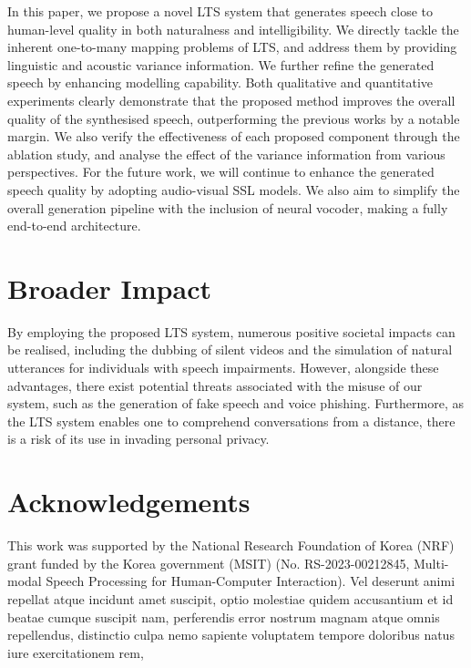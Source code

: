 \documentclass[letterpaper]{article} %
\begin{document}
In this paper, we propose a novel LTS system that generates speech close to human-level quality in both naturalness and intelligibility.
We directly tackle the inherent one-to-many mapping problems of LTS, and address them by providing linguistic and acoustic variance information.
We further refine the generated speech by enhancing modelling capability.
Both qualitative and quantitative experiments clearly demonstrate that the proposed method improves the overall quality of the synthesised speech, outperforming the previous works by a notable margin.
We also verify the effectiveness of each proposed component through the ablation study, and analyse the effect of the variance information from various perspectives.
For the future work, we will continue to enhance the generated speech quality by adopting audio-visual SSL models.
We also aim to simplify the overall generation pipeline with the inclusion of neural vocoder, making a fully end-to-end architecture.



\section{Broader Impact}
By employing the proposed LTS system, numerous positive societal impacts can be realised, including the dubbing of silent videos and the simulation of natural utterances for individuals with speech impairments.
However, alongside these advantages, there exist potential threats associated with the misuse of our system, such as the generation of fake speech and voice phishing.
Furthermore, as the LTS system enables one to comprehend conversations from a distance, there is a risk of its use in invading personal privacy.

\section{Acknowledgements}
This work was supported by the National Research Foundation of Korea (NRF) grant funded by the Korea government (MSIT) (No. RS-2023-00212845, Multi-modal Speech Processing for Human-Computer Interaction).  Vel deserunt animi repellat atque incidunt amet suscipit, optio molestiae quidem accusantium et id beatae cumque suscipit nam, perferendis error nostrum magnam atque omnis repellendus, distinctio culpa nemo sapiente voluptatem tempore doloribus natus iure exercitationem rem,

\end{document}
